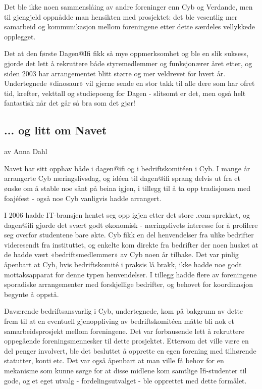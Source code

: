 \documentclass[../main.tex]{subfiles}
\begin{document}
Det ble ikke noen sammenslåing av andre foreninger enn Cyb og Verdande, men til gjengjeld oppnådde man hensikten med prosjektet: det ble vesentlig mer samarbeid og kommunikasjon mellom foreningene etter dette særdeles vellykkede opplegget.

Det at den første Dagen@Ifi fikk så mye oppmerksomhet og ble en slik suksess, gjorde det lett å rekruttere både styremedlemmer og funksjonærer året etter, og siden 2003 har arrangementet blitt større og mer veldrevet for hvert år. Undertegnede «dinosaur» vil gjerne sende en stor takk til alle dere som har ofret tid, krefter, vekttall og studiepoeng for Dagen - slitsomt er det, men også helt fantastisk når det går så bra som det gjør!

\subsection{... og litt om Navet}
av Anna Dahl

Navet har sitt opphav både i dagen@ifi og i bedriftskomitéen i Cyb. I mange år arrangerte Cyb næringslivsdag, og idéen til dagen@ifi sprang delvis ut fra et ønske om å stable noe sånt på beina igjen, i tillegg til å ta opp tradisjonen med foajéfest - også noe Cyb vanligvis hadde arrangert.

I 2006 hadde IT-bransjen hentet seg opp igjen etter det store .com-sprekket, og dagen@ifi gjorde det svært godt økonomisk - næringslivets interesse for å profilere seg overfor studentene bare økte. Cyb fikk en del henvendelser fra ulike bedrifter videresendt fra instituttet, og enkelte kom direkte fra bedrifter der noen husket at de hadde vært «bedriftsmedlemmer» av Cyb noen år tilbake. Det var pinlig åpenbart at Cyb, hvis bedriftskomité i praksis lå brakk, ikke hadde noe godt mottaksapparat for denne typen henvendelser. I tillegg hadde flere av foreningene sporadiske arrangementer med forskjellige bedrifter, og behovet for koordinasjon begynte å oppstå.

Daværende bedriftsansvarlig i Cyb, undertegnede, kom på bakgrunn av dette frem til at en eventuell gjenoppliving av bedriftskomitéen måtte bli nok et samarbeidsprosjekt mellom foreningene. Det var forbausende lett å rekruttere oppegående foreningsmennesker til dette prosjektet. Ettersom det ville være en del penger involvert, ble det besluttet å opprette en egen forening med tilhørende statutter, konti etc. Det var også åpenbart at man ville få behov for en mekanisme som kunne sørge for at disse midlene kom samtlige Ifi-studenter til gode, og et eget utvalg - fordelingsutvalget - ble opprettet med dette formålet.
\end{document}

